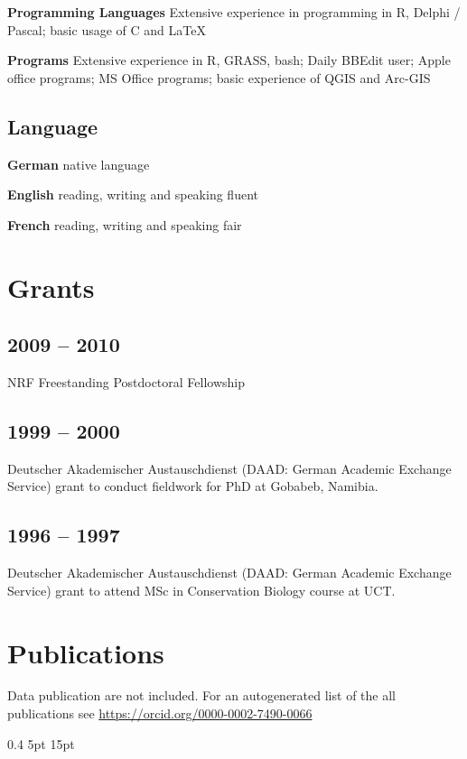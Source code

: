 \documentclass[a4paper]{article}
\begin{document}
\textbf{Programming Languages} Extensive experience in programming in R,
	Delphi / Pascal; basic usage of C and \LaTeX{}

\textbf{Programs} Extensive experience in R, GRASS, bash; Daily BBEdit user;
	Apple office programs; MS Office programs; basic experience of QGIS and
	Arc-GIS

\subsection{Language}

\textbf{German} native language

\textbf{English} reading, writing and speaking fluent

\textbf{French} reading, writing and speaking fair

\section{Grants}

\subsection{2009 -- 2010}

NRF Freestanding Postdoctoral Fellowship

\subsection{1999 -- 2000}

Deutscher Akademischer Austauschdienst (DAAD: German Academic Exchange
	Service) grant to conduct fieldwork for PhD at Gobabeb, Namibia.

\subsection{1996 -- 1997}

Deutscher Akademischer Austauschdienst (DAAD: German Academic Exchange
	Service) grant to attend MSc in Conservation Biology course at UCT.

\section{Publications}

Data publication are not included. For an autogenerated list of the all
	publications see \url{https://orcid.org/0000-0002-7490-0066}

\titlespacing{\subsection}
            {0.4\textwidth}%
            {5pt}%
            {15pt}%
\end{document}
